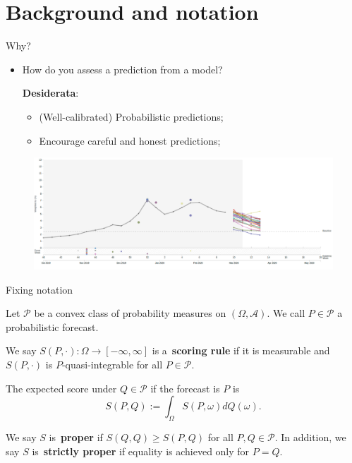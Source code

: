 \section{Background and notation}
\begin{frame}{Why?}
\begin{itemize}
 \item How do you assess a prediction from a model?

 \textbf{Desiderata}:
 \begin{itemize}
  \item (Well-calibrated) Probabilistic predictions;
  \item Encourage careful and honest predictions;
 \end{itemize}
\end{itemize}
\begin{figure}
 \begin{center}
  \includegraphics[scale=.3]{figures/flu_forecasts.pdf}
 \end{center}

\end{figure}

\end{frame}
\begin{frame}{Fixing notation}

Let $\mathcal{P}$ be a convex class of probability measures on $(\Omega, \mathcal{A})$.
We call $P \in \mathcal{P}$ a probabilistic forecast. 
\begin{definition}
 We say $S(P, \cdot) : \Omega \to [-\infty, \infty]$ is a~\textbf{scoring rule} if it is measurable and $S(P, \cdot)$ is $P$-quasi-integrable for all $P \in \mathcal{P}$.
\end{definition}
The expected score under $Q \in \mathcal{P}$ if the forecast is $P$ is
\begin{equation}
 \nonumber
 S(P, Q) := \int_{\Omega} S(P, \omega)dQ(\omega). 
\end{equation}

\begin{definition}
We say $S$ is~\textbf{proper} if $S(Q, Q) \geq S(P, Q)$ for all $P, Q \in \mathcal{P}$.
In addition, we say $S$ is~\textbf{strictly proper} if equality is achieved only for $P = Q$.
\end{definition}
\end{frame}
